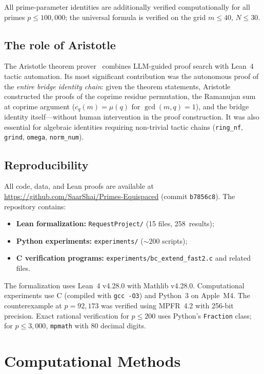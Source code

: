 \documentclass[11pt]{article}
\theoremstyle{definition}
\begin{document}
\noindent All prime-parameter identities are additionally verified
computationally for all primes $p \le 100{,}000$; the universal
formula is verified on the grid $m \le 40$, $N \le 30$.

\subsection{The role of Aristotle}

The Aristotle theorem prover~\cite{Aristotle2025} combines
LLM-guided proof search with Lean~4 tactic automation.
Its most significant contribution was the autonomous proof of the
\emph{entire bridge identity chain}: given the theorem statements,
Aristotle constructed the proofs of the coprime residue permutation,
the Ramanujan sum at coprime argument ($c_q(m) = \mu(q)$ for
$\gcd(m,q) = 1$), and the bridge identity itself---without human
intervention in the proof construction.  It was also essential for
algebraic identities requiring non-trivial tactic chains
(\texttt{ring\_nf}, \texttt{grind}, \texttt{omega}, \texttt{norm\_num}).

\subsection{Reproducibility}

All code, data, and Lean proofs are available at
\url{https://github.com/SaarShai/Primes-Equispaced}
(commit \texttt{b7856c8}).
The repository contains:
\begin{itemize}
  \item \textbf{Lean formalization:} \texttt{RequestProject/}
    (15 files, 258~results);
  \item \textbf{Python experiments:} \texttt{experiments/}
    ($\sim\!200$ scripts);
  \item \textbf{C verification programs:}
    \texttt{experiments/bc\_extend\_fast2.c} and related files.
\end{itemize}
The formalization uses Lean~4 v4.28.0 with Mathlib v4.28.0.
Computational experiments use C (compiled with \texttt{gcc~-O3})
and Python~3 on Apple~M4.  The counterexample at $p = 92{,}173$
was verified using MPFR~4.2 with 256-bit precision.
Exact rational verification for $p \le 200$ uses Python's
\texttt{Fraction} class; for $p \le 3{,}000$, \texttt{mpmath}
with 80 decimal digits.


\section{Computational Methods}\label{sec:computation}
\end{document}
